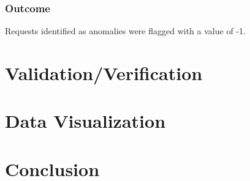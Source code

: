 \subsubsection{Outcome}
Requests identified as anomalies were flagged with a value of -1.

\section{Validation/Verification}

\section{Data Visualization}

\section{Conclusion}

